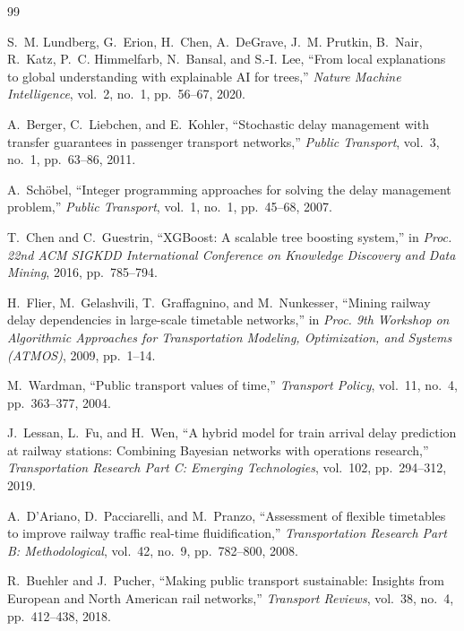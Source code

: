 \documentclass[11pt,a4paper]{article}
\renewenvironment{thebibliography}[1]{
  \begin{oldthebibliography}{#1}
    \setlength{\itemsep}{0.15em}
    \setlength{\parskip}{0em}
}
{
  \end{oldthebibliography}
}
\begin{document}
\begin{thebibliography}{99}
S.~M. Lundberg, G.~Erion, H.~Chen, A.~DeGrave, J.~M. Prutkin, B.~Nair, R.~Katz, P.~C. Himmelfarb, N.~Bansal, and S.-I. Lee, ``From local explanations to global understanding with explainable AI for trees,'' \emph{Nature Machine Intelligence}, vol.~2, no.~1, pp.~56--67, 2020.

A.~Berger, C.~Liebchen, and E.~Kohler, ``Stochastic delay management with transfer guarantees in passenger transport networks,'' \emph{Public Transport}, vol.~3, no.~1, pp.~63--86, 2011.

A.~Sch{\"o}bel, ``Integer programming approaches for solving the delay management problem,'' \emph{Public Transport}, vol.~1, no.~1, pp.~45--68, 2007.

T.~Chen and C.~Guestrin, ``XGBoost: A scalable tree boosting system,'' in \emph{Proc. 22nd ACM SIGKDD International Conference on Knowledge Discovery and Data Mining}, 2016, pp.~785--794.

H.~Flier, M.~Gelashvili, T.~Graffagnino, and M.~Nunkesser, ``Mining railway delay dependencies in large-scale timetable networks,'' in \emph{Proc. 9th Workshop on Algorithmic Approaches for Transportation Modeling, Optimization, and Systems (ATMOS)}, 2009, pp.~1--14.

M.~Wardman, ``Public transport values of time,'' \emph{Transport Policy}, vol.~11, no.~4, pp.~363--377, 2004.

J.~Lessan, L.~Fu, and H.~Wen, ``A hybrid model for train arrival delay prediction at railway stations: Combining Bayesian networks with operations research,'' \emph{Transportation Research Part C: Emerging Technologies}, vol.~102, pp.~294--312, 2019.

A.~D'Ariano, D.~Pacciarelli, and M.~Pranzo, ``Assessment of flexible timetables to improve railway traffic real-time fluidification,'' \emph{Transportation Research Part B: Methodological}, vol.~42, no.~9, pp.~782--800, 2008.

R.~Buehler and J.~Pucher, ``Making public transport sustainable: Insights from European and North American rail networks,'' \emph{Transport Reviews}, vol.~38, no.~4, pp.~412--438, 2018.

\end{thebibliography}
\end{document}
